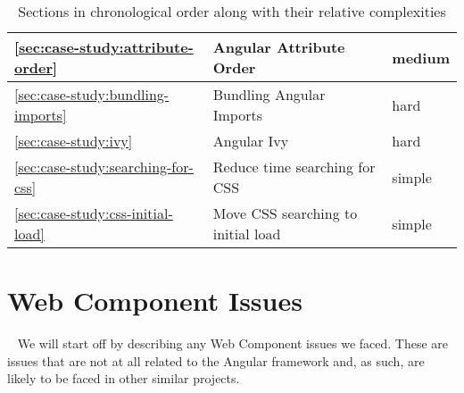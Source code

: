 \begin{table}[h]
\begin{tabularx}{\textwidth}{l|X|l}
    \ref{sec:case-study:attribute-order}        & Angular Attribute Order            & medium                       \\ \hline
    \ref{sec:case-study:bundling-imports}       & Bundling Angular Imports           & hard                         \\ \hline
    \ref{sec:case-study:ivy}                    & Angular Ivy                        & hard                         \\ \hline
    \ref{sec:case-study:searching-for-css}      & Reduce time searching for CSS      & simple                       \\ \hline
    \ref{sec:case-study:css-initial-load}       & Move CSS searching to initial load & simple                       \\
  \end{tabularx}
  \caption{Sections in chronological order along with their relative complexities}
  \label{tab:case-study:chronological-issues}
\end{table}

\section{Web Component Issues}~\label{sec:web-component-issues}
We will start off by describing any Web Component issues we faced. These are issues that are not at all related to the Angular framework and, as such, are likely to be faced in other similar projects.

